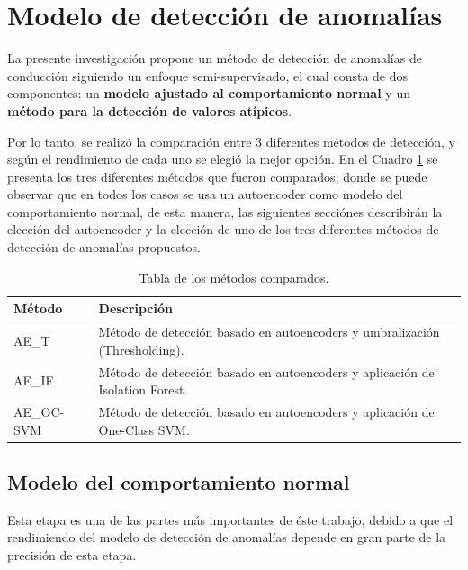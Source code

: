 \section{Modelo de detecci\'{o}n de anomal\'{i}as}

La presente investigaci\'{o}n propone un m\'{e}todo de detecci\'{o}n de anomal\'{i}as de conducci\'{o}n siguiendo un enfoque semi-supervisado, el cual consta de dos componentes: un \textbf{modelo ajustado al comportamiento normal} y un \textbf{m\'{e}todo para la detecci\'{o}n de valores at\'{i}picos}.

\vspace{5mm} %

Por lo tanto, se realiz\'{o} la comparaci\'{o}n entre 3 diferentes m\'{e}todos de detecci\'{o}n, y seg\'{u}n el rendimiento de cada uno se elegi\'{o} la mejor opci\'{o}n. En el Cuadro \ref{table:metodos_comparados} se presenta los tres diferentes m\'{e}todos que fueron comparados; donde se puede observar que en todos los casos se usa un autoencoder como modelo del comportamiento normal, de esta manera, las siguientes secci\'{o}nes describir\'{a}n la elecci\'{o}n del autoencoder y la elecci\'{o}n de uno de los tres diferentes m\'{e}todos de detecci\'{o}n de anomal\'{i}as propuestos.

\begin{table}[H]
\centering
\begin{tabular}{|l|p{100mm}|}
\hline
\textbf{M\'{e}todo} & \textbf{Descripci\'{o}n} \\ \hline
AE\_T & M\'{e}todo de detecci\'{o}n basado en autoencoders y umbralizaci\'{o}n (Thresholding). \\ \hline
AE\_IF & M\'{e}todo de detecci\'{o}n basado en autoencoders y aplicaci\'{o}n de Isolation Forest.  \\ \hline
AE\_OC-SVM & M\'{e}todo de detecci\'{o}n basado en autoencoders y aplicaci\'{o}n de One-Class SVM. \\ \hline
\end{tabular}
\caption{Tabla de los m\'{e}todos comparados.}
\label{table:metodos_comparados}
\end{table}

\subsection{Modelo del comportamiento normal}

Esta etapa es una de las partes m\'{a}s importantes de \'{e}ste trabajo, debido a que el rendimiendo del modelo de detecci\'{o}n de anomal\'{i}as depende en gran parte de la precisi\'{o}n de esta etapa.

